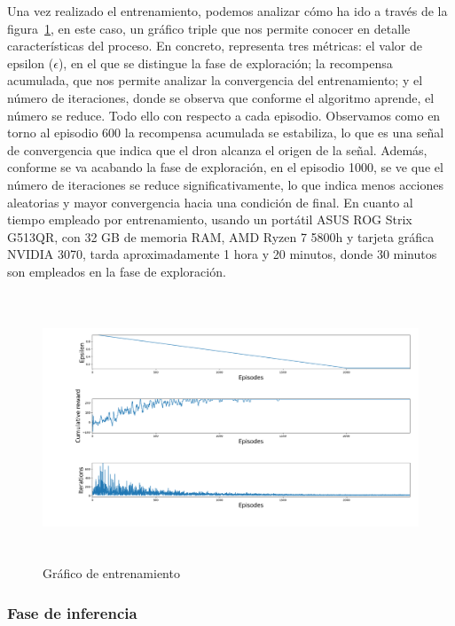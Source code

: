 Una vez realizado el entrenamiento, podemos analizar cómo ha ido a través de la figura~\ref{fig:training_graph}, en este caso, un gráfico triple que nos permite conocer en detalle características del proceso. En concreto, representa tres métricas: el valor de epsilon ($\epsilon$), en el que se distingue la fase de exploración; la recompensa acumulada, que nos permite analizar la convergencia del entrenamiento; y el número de iteraciones, donde se observa que conforme el algoritmo aprende, el número se reduce. Todo ello con respecto a cada episodio. Observamos como en torno al episodio 600 la recompensa acumulada se estabiliza, lo que es una señal de convergencia que indica que el dron alcanza el origen de la señal. Además, conforme se va acabando la fase de exploración, en el episodio 1000, se ve que el número de iteraciones se reduce significativamente, lo que indica menos acciones aleatorias y mayor convergencia hacia una condición de final. En cuanto al tiempo empleado por entrenamiento, usando un portátil ASUS ROG Strix G513QR, con 32 GB de memoria RAM, AMD Ryzen 7 5800h y tarjeta gráfica NVIDIA 3070, tarda aproximadamente 1 hora y 20 minutos, donde 30 minutos son empleados en la fase de exploración.\\

\begin{figure} [t]
    \begin{center}
    \includegraphics[height=8cm]{imagenes/cap4/14_training_graph.png}
    \end{center}
    \caption[Gráfico de entrenamiento]{Gráfico de entrenamiento}
    \label{fig:training_graph}
\end{figure}

\subsubsection{Fase de inferencia}
\label{subsubsec:test}

